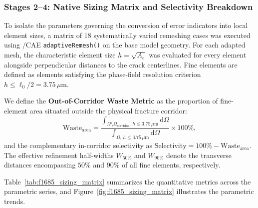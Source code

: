 \subsubsection{Stages 2--4: Native Sizing Matrix and Selectivity Breakdown}
To isolate the parameters governing the conversion of error indicators into local element sizes, a matrix of $18$ systematically varied remeshing cases was executed using \Abaqus/CAE \texttt{adaptiveRemesh()} on the base model geometry. For each adapted mesh, the characteristic element size $h = \sqrt{A_e}$ was evaluated for every element alongside perpendicular distances to the crack centerlines. Fine elements are defined as elements satisfying the phase-field resolution criterion $h \le \ell_0/2 = 3.75\,\mu\mathrm{m}$.

We define the \textbf{Out-of-Corridor Waste Metric} as the proportion of fine-element area situated outside the physical fracture corridor:
\begin{equation}
  \mathrm{Waste}_{\mathrm{area}} = \frac{\int_{\Omega \setminus \Omega_{\mathrm{corridor}},\, h \le 3.75\,\mu\mathrm{m}} \mathrm{d}\Omega}{\int_{\Omega,\, h \le 3.75\,\mu\mathrm{m}} \mathrm{d}\Omega} \times 100\%,
  \label{eq:waste_metric}
\end{equation}
and the complementary in-corridor selectivity as $\mathrm{Selectivity} = 100\% - \mathrm{Waste}_{\mathrm{area}}$. The effective refinement half-widths $W_{50\%}$ and $W_{90\%}$ denote the transverse distances encompassing $50\%$ and $90\%$ of all fine elements, respectively.

Table~\ref{tab:f1685_sizing_matrix} summarizes the quantitative metrics across the parametric series, and Figure~\ref{fig:f1685_sizing_matrix} illustrates the parametric trends.

